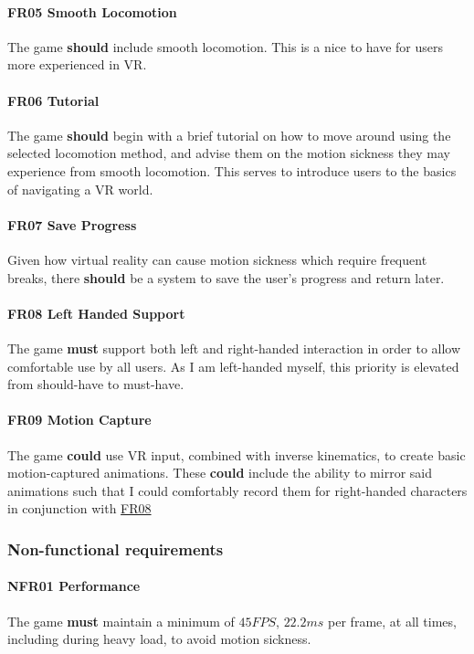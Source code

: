 \documentclass[sigconf]{acmart}
\begin{document}
\paragraph{\label{sec:fr_smooth}FR05 Smooth Locomotion}
The game \textbf{should} include smooth locomotion. This is a nice to have for
users more experienced in VR.

\paragraph{\label{sec:fr_tutorial}FR06 Tutorial}
The game \textbf{should} begin with a brief tutorial on how to move around
using the selected locomotion method, and advise them on the motion sickness
they may experience from smooth locomotion. This serves to introduce users to
the basics of navigating a VR world.

\paragraph{\label{sec:fr_save}FR07 Save Progress}
Given how virtual reality can cause motion sickness which require frequent
breaks, there \textbf{should} be a system to save the user's progress and return
later.

\paragraph{\label{sec:fr_lefty}FR08 Left Handed Support}
The game \textbf{must} support both left and right-handed interaction in order
to allow comfortable use by all users. As I am left-handed myself, this priority
is elevated from should-have to must-have.

\paragraph{\label{sec:fr_mocap}FR09 Motion Capture}
The game \textbf{could} use VR input, combined with inverse kinematics, to
create basic motion-captured animations. These \textbf{could} include the ability
to mirror said animations such that I could comfortably record them for right-handed
characters in conjunction with \hyperref[sec:fr_lefty]{FR08}

\subsubsection{Non-functional requirements}

\paragraph{\label{sec:nfr_performance}NFR01 Performance}
The game \textbf{must} maintain a minimum of $45FPS$, $22.2ms$ per frame, at all
times, including during heavy load, to avoid motion sickness.
\end{document}
